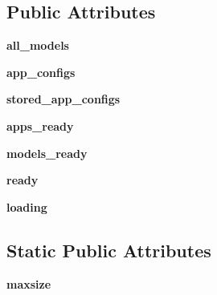 \subsection*{Public Attributes}
\begin{DoxyCompactItemize}
\item 
\mbox{\label{classdjango_1_1apps_1_1registry_1_1_apps_a10087b0b4a316aa83de3f97bf955ef31}} 
{\bfseries all\+\_\+models}
\item 
\mbox{\label{classdjango_1_1apps_1_1registry_1_1_apps_a4c80626b629b05cfdd44a843290d7c2b}} 
{\bfseries app\+\_\+configs}
\item 
\mbox{\label{classdjango_1_1apps_1_1registry_1_1_apps_a02cd7774f0c9c3d48073ce241ebf39d4}} 
{\bfseries stored\+\_\+app\+\_\+configs}
\item 
\mbox{\label{classdjango_1_1apps_1_1registry_1_1_apps_ab63e3c2896cf628215f7cfae69ed0bce}} 
{\bfseries apps\+\_\+ready}
\item 
\mbox{\label{classdjango_1_1apps_1_1registry_1_1_apps_a514ca283738ee59156561385e93440d5}} 
{\bfseries models\+\_\+ready}
\item 
\mbox{\label{classdjango_1_1apps_1_1registry_1_1_apps_a5478a6336cfc3361a075bad4bc1ebaab}} 
{\bfseries ready}
\item 
\mbox{\label{classdjango_1_1apps_1_1registry_1_1_apps_a1350cf3bb94cc1860c881ce7ef3676e8}} 
{\bfseries loading}
\end{DoxyCompactItemize}
\subsection*{Static Public Attributes}
\begin{DoxyCompactItemize}
\item 
\mbox{\label{classdjango_1_1apps_1_1registry_1_1_apps_a99a18b6e6cf89c22ed6fc043e8c29881}} 
{\bfseries maxsize}
\end{DoxyCompactItemize}


